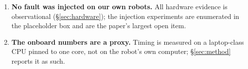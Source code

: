 \begin{enumerate}
  dynamics model; the raw-element test detects none of them at $\times1.5$ while holding its level. Where no model is
  available, that fault family is out of scope.
\item \textbf{No fault was injected on our own robots.} All hardware evidence is observational
  (\S\ref{sec:hardware}); the injection experiments are enumerated in the placeholder box and are the paper's largest
  open item.
\item \textbf{The onboard numbers are a proxy.} Timing is measured on a laptop-class CPU pinned to one core, not on the
  robot's own computer; \S\ref{sec:method} reports it as such.
\end{enumerate}
